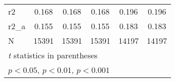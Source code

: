 {\begin{tabular}{l*{5}{c}}
r2          &       0.168         &       0.168         &       0.168         &       0.196         &       0.196         \\
r2\_a        &       0.155         &       0.155         &       0.155         &       0.183         &       0.183         \\
N           &       15391         &       15391         &       15391         &       14197         &       14197         \\
\hline\hline
\multicolumn{6}{l}{\footnotesize \textit{t} statistics in parentheses}\\
\multicolumn{6}{l}{\footnotesize \sym{*} \(p<0.05\), \sym{**} \(p<0.01\), \sym{***} \(p<0.001\)}\\
\end{tabular}
}
